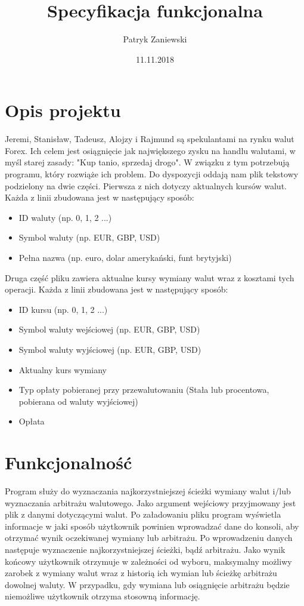 \documentclass{article}
\title{Specyfikacja funkcjonalna}
\author{Patryk Zaniewski}
\date{11.11.2018}
\begin{document}
\maketitle
\tableofcontents
\newpage

\section{Opis projektu}
Jeremi, Stanisław, Tadeusz, Alojzy i Rajmund są spekulantami na rynku walut Forex. Ich celem jest osiągnięcie jak największego zysku na handlu walutami, w myśl starej zasady: "Kup tanio, sprzedaj drogo". W związku z tym potrzebują programu, który rozwiąże ich problem. Do dyspozycji oddają nam plik tekstowy podzielony na dwie części.
\newline\newline
Pierwsza z nich dotyczy aktualnych kursów walut. Każda z linii zbudowana jest w następujący sposób:
\begin{itemize}
    \item ID waluty (np. 0, 1, 2 ...)
    \item Symbol waluty (np. EUR, GBP, USD)
    \item Pełna nazwa (np. euro, dolar amerykański, funt brytyjski)
\end{itemize}
Druga część pliku zawiera aktualne kursy wymiany walut wraz z kosztami tych operacji. Każda z linii zbudowana jest w następujący sposób:
\begin{itemize}
    \item ID kursu (np. 0, 1, 2 ...)
    \item Symbol waluty wejściowej (np. EUR, GBP, USD)
    \item Symbol waluty wyjściowej (np. EUR, GBP, USD)
    \item Aktualny kurs wymiany
    \item Typ opłaty pobieranej przy przewalutowaniu (Stała lub procentowa, pobierana od waluty wyjściowej)
    \item Opłata
\end{itemize}

\section{Funkcjonalność}
Program służy do wyznaczania najkorzystniejszej ścieżki wymiany walut i/lub wyznaczania arbitrażu walutowego. 
\newline\newline Jako argument wejściowy przyjmowany jest plik z danymi dotyczącymi walut. Po załadowaniu pliku program wyświetla informacje w jaki sposób użytkownik powinien wprowadzać dane do konsoli, aby otrzymać wynik oczekiwanej wymiany lub arbitrażu. Po wprowadzeniu danych następuje wyznaczenie najkorzystniejszej ścieżki, bądź arbitrażu.
\newline\newline Jako wynik końcowy użytkownik otrzymuje w zależności od wyboru, maksymalny możliwy zarobek z wymiany walut wraz z historią ich wymian lub ścieżkę arbitrażu dowolnej waluty. W przypadku, gdy wymiana lub osiągnięcie arbitrażu będzie niemożliwe użytkownik otrzyma stosowną informację.
\end{document}

